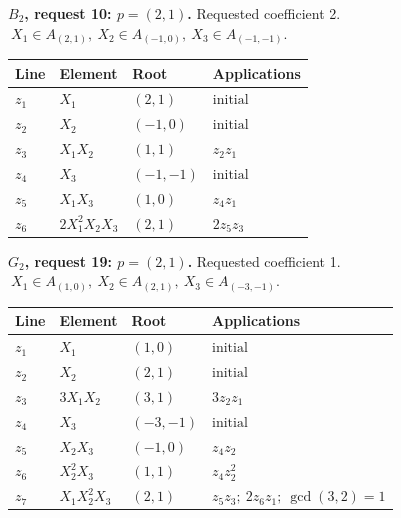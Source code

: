 \par\medskip\noindent\begin{minipage}{\textwidth}
\textbf{\(B_2\), request 10: \(p=(2,1)\).} Requested coefficient 2.
\(\ X_1\in A_{(2,1)},\ X_2\in A_{(-1,0)},\ X_3\in A_{(-1,-1)}.\)\par
\smallskip\centering\small\begin{tabular}{@{}llll@{}}\toprule
Line & Element & Root & Applications\\\midrule
\(z_{1}\) & \(X_1\) & \((2,1)\) & \(\text{initial}\) \\
\(z_{2}\) & \(X_2\) & \((-1,0)\) & \(\text{initial}\) \\
\(z_{3}\) & \(X_1X_2\) & \((1,1)\) & \(z_{2}z_{1}\) \\
\(z_{4}\) & \(X_3\) & \((-1,-1)\) & \(\text{initial}\) \\
\(z_{5}\) & \(X_1X_3\) & \((1,0)\) & \(z_{4}z_{1}\) \\
\(z_{6}\) & \(2X_1^{2}X_2X_3\) & \((2,1)\) & \(2z_{5}z_{3}\) \\
\bottomrule\end{tabular}\end{minipage}\par
\par\medskip\noindent\begin{minipage}{\textwidth}
\textbf{\(G_2\), request 19: \(p=(2,1)\).} Requested coefficient 1.
\(\ X_1\in A_{(1,0)},\ X_2\in A_{(2,1)},\ X_3\in A_{(-3,-1)}.\)\par
\smallskip\centering\small\begin{tabular}{@{}llll@{}}\toprule
Line & Element & Root & Applications\\\midrule
\(z_{1}\) & \(X_1\) & \((1,0)\) & \(\text{initial}\) \\
\(z_{2}\) & \(X_2\) & \((2,1)\) & \(\text{initial}\) \\
\(z_{3}\) & \(3X_1X_2\) & \((3,1)\) & \(3z_{2}z_{1}\) \\
\(z_{4}\) & \(X_3\) & \((-3,-1)\) & \(\text{initial}\) \\
\(z_{5}\) & \(X_2X_3\) & \((-1,0)\) & \(z_{4}z_{2}\) \\
\(z_{6}\) & \(X_2^{2}X_3\) & \((1,1)\) & \(z_{4}z_{2}^{2}\) \\
\(z_{7}\) & \(X_1X_2^{2}X_3\) & \((2,1)\) & \(z_{5}z_{3};\ 2z_{6}z_{1};\ \gcd(3,2)=1\) \\
\bottomrule\end{tabular}\end{minipage}\par
